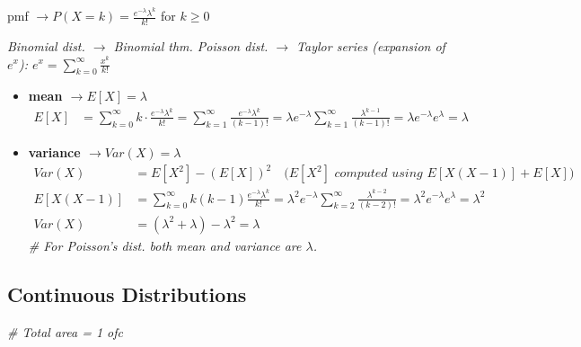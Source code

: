 \documentclass[11pt,a4paper]{article}
\begin{document}
pmf $\rightarrow P(X=k) = \frac{e^{-\lambda} \lambda^k}{k!}$ for $k \geq 0$

\textit{Binomial dist. $\rightarrow$ Binomial thm. Poisson dist. $\rightarrow$ Taylor series (expansion of $e^x$): $e^x = \sum_{k=0}^\infty \frac{x^k}{k!}$}

\begin{itemize}
    \item \textbf{mean $\rightarrow E[X] = \lambda$}
    \begin{align*}
        E[X] &= \sum_{k=0}^\infty k \cdot \frac{e^{-\lambda} \lambda^k}{k!} 
        = \sum_{k=1}^\infty \frac{e^{-\lambda} \lambda^k}{(k-1)!} 
        = \lambda e^{-\lambda} \sum_{k=1}^\infty \frac{\lambda^{k-1}}{(k-1)!} 
        = \lambda e^{-\lambda} e^{\lambda} = \lambda
    \end{align*}

    \item \textbf{variance $\rightarrow Var(X) = \lambda$}
    \begin{align*}
        Var(X) &= E[X^2] - (E[X])^2 \quad \textit{($E[X^2]$ computed using $E[X(X-1)] + E[X]$)} \\
        E[X(X-1)] &= \sum_{k=0}^\infty k(k-1) \frac{e^{-\lambda} \lambda^k}{k!} 
        = \lambda^2 e^{-\lambda} \sum_{k=2}^\infty \frac{\lambda^{k-2}}{(k-2)!} 
        = \lambda^2 e^{-\lambda} e^{\lambda} = \lambda^2 \\
        Var(X) &= (\lambda^2 + \lambda) - \lambda^2 = \lambda
    \end{align*}
    \textit{\# For Poisson's dist. both mean and variance are $\lambda$.}
\end{itemize}

\newpage
\subsection*{Continuous Distributions}
\textit{\# Total area = 1 ofc}
\end{document}
